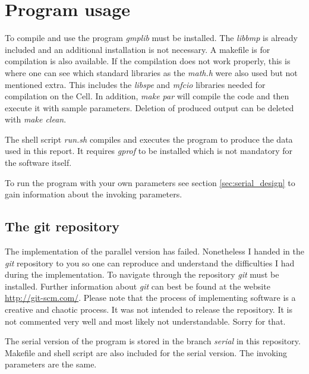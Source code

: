 \section{Program usage}
\label{sec:usage}

To compile and use the program \emph{gmplib} must be installed. The \emph{libbmp} is already included and an additional installation is not necessary. A makefile is for compilation is also available. If the compilation does not work properly, this is where one can see which standard libraries as the \emph{math.h} were also used but not mentioned extra. This includes the \emph{libspe} and \emph{mfcio} libraries needed for compilation on the Cell. In addition, \emph{make par} will compile the code and then execute it with sample parameters. Deletion of produced output can be deleted with \emph{make clean}.

The shell script \emph{run.sh} compiles and executes the program to produce the data used in this report. It requires \emph{gprof} to be installed which is not mandatory for the software itself.

To run the program with your own parameters see section \ref{sec:serial_design} to gain information about the invoking parameters.

\subsection{The git repository}
The implementation of the parallel version has failed. Nonetheless I handed in the \emph{git} repository to you so one can reproduce and understand the difficulties I had during the implementation. To navigate through the repository \emph{git} must be installed. Further information about \emph{git} can best be found at the website \url{http://git-scm.com/}.
Please note that the process of implementing software is a creative and chaotic process. It was not intended to release the repository. It is not commented very well and most likely not understandable. Sorry for that.

The serial version of the program is stored in the branch \emph{serial} in this repository. Makefile and shell script are also included for the serial version. The invoking parameters are the same. 


